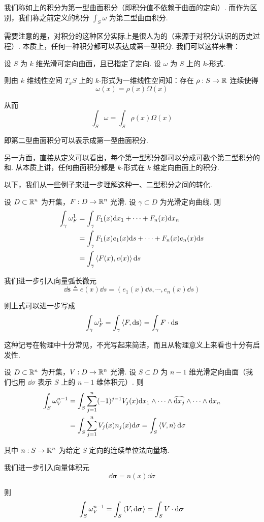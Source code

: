 我们称如上的积分为第一型曲面积分（即积分值不依赖于曲面的定向）. 而作为区别，我们称之前定义的积分 $\displaystyle\int_S\omega$ 为第二型曲面积分.

\begin{hint}
    需要注意的是，对积分的这种区分实际上是很人为的（来源于对积分认识的历史过程）. 本质上，任何一种积分都可以表达成第一型积分. 我们可以这样来看：

    设 $S$ 为 $k$ 维光滑可定向曲面，且已指定了定向. 设 $\omega$ 为 $S$ 上的 $k$-形式.
    
    则由 $k$ 维线性空间 $T_xS$ 上的 $k$-形式为一维线性空间知：存在 $\rho:S\to\mathbb{R}$ 连续使得
$$
\omega(x)=\rho(x)\Omega(x)
$$

    从而
$$
\int_S\omega=\int_S\rho(x)\Omega(x)
$$

    即第二型曲面积分可以表示成第一型曲面积分.

    另一方面，直接从定义可以看出，每个第一型积分都可以分成可数个第二型积分的和. 从本质上讲，任何曲面积分都是 $k$-形式在 $k$ 维定向曲面上的积分.
\end{hint}

以下，我们从一些例子来进一步理解这种一、二型积分之间的转化.

\begin{example}[ 力沿路径做的功]
    设 $D\subset\mathbb{R}^n$ 为开集，$F:D\to\mathbb{R}^n$ 光滑. 设 $\gamma\subset D$ 为光滑定向曲线. 则
$$
\begin{aligned}
    \int_\gamma\omega_F^1&=\int_\gamma F_1(x)\mathrm{d} x_1+\cdots+F_n(x)\mathrm{d} x_n\\
    &=\int_\gamma F_1(x)e_1(x)\mathrm{d} s+\cdots+F_n(x)e_n(x)\mathrm{d} s\\
    &=\int_\gamma\left\langle{F(x),e(x)}\right\rangle\mathrm{d} s
\end{aligned}
$$

    我们进一步引入向量弧长微元
$$
\dd\mathbf{s}\triangleq e(x)\dd s=(e_1(x)\dd s,\cdots,e_n(x)\dd s)
$$

    则上式可以进一步写成
$$
\int_\gamma\omega_F^1=\int_\gamma\left\langle{F,\mathrm{d}\mathbf{s}}\right\rangle=\int_\gamma F\cdot\mathrm{d}\mathbf{s}
$$

    这种记号在物理中十分常见，不光写起来简洁，而且从物理意义上来看也十分有启发性.
\end{example}

\begin{example}[ 稳定流的流量]
    设 $D\subset\mathbb{R}^n$ 为开集，$V:D\to\mathbb{R}^n$ 光滑. 设 $S\subset D$ 为 $n-1$ 维光滑定向曲面（我们也用 $\dd\sigma$ 表示 $S$ 上的 $n-1$ 维体积元）. 则
$$
\begin{aligned}
\int_S\omega_V^{n-1}&=\int_S\sum_{j=1}^n(-1)^{j-1}V_j(x)\mathrm{d} x_1\wedge\cdots\wedge\widehat{\mathrm{d} x_j}\wedge\cdots\wedge\mathrm{d} x_n\\
&=\int_S\sum_{j=1}^nV_j(x)n_j(x)\mathrm{d}\sigma=\int_S\left\langle{V,n}\right\rangle\mathrm{d}\sigma
\end{aligned}
$$

    其中 $n:S\to\mathbb{R}^n$ 为给定 $S$ 定向的连续单位法向量场.

    我们进一步引入向量体积元
$$
\dd\bm{\sigma}=n(x)\dd\sigma
$$

    则
$$
\int_S\omega_V^{n-1}=\int_S\left\langle{V,\mathrm{d}\bm{\sigma}}\right\rangle=\int_S V\cdot\mathrm{d}\bm{\sigma}
$$
\end{example}

